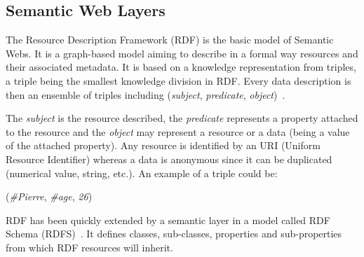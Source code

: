 \documentclass{vgtc}                          %
\begin{document}
\subsection{Semantic Web Layers}

The Resource Description Framework (RDF) is the basic model of Semantic Webs. It is a graph-based model aiming to describe in a formal way resources and their associated metadata. It is based on a knowledge representation from triples, a triple being the smallest knowledge division in RDF. Every data description is then an ensemble of triples including (\textit{subject}, \textit{predicate}, \textit{object})~\cite{godel1999bach}.

The \textit{subject} is the resource described, the \textit{predicate} represents a property attached to the resource and the \textit{object} may represent a resource or a data (being a value of the attached property). Any resource is identified by an URI (Uniform Resource Identifier) whereas a data is anonymous since it can be duplicated (numerical value, string, etc.). An example of a triple could be:
\centerline{(\textit{\#Pierre}, \textit{\#age}, \textit{26})}

RDF has been quickly extended by a semantic layer in a model called RDF Schema (RDFS)~\cite{brickley2004rdf}. It defines classes, sub-classes, properties and sub-properties from which RDF resources will inherit. 



\end{document}
